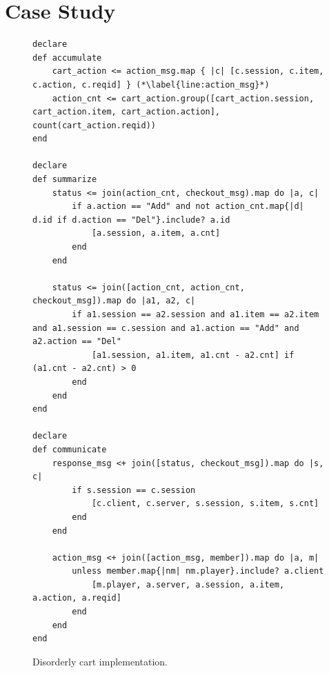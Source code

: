 \section{Case Study}
\label{sec:case}

\begin{figure}[t]
\begin{scriptsize}
\begin{lstlisting}
declare
def accumulate
	cart_action <= action_msg.map { |c| [c.session, c.item, c.action, c.reqid] } (*\label{line:action_msg}*)
	action_cnt <= cart_action.group([cart_action.session, cart_action.item, cart_action.action], count(cart_action.reqid))
end

declare
def summarize
	status <= join(action_cnt, checkout_msg).map do |a, c|
		if a.action == "Add" and not action_cnt.map{|d| d.id if d.action == "Del"}.include? a.id 
			[a.session, a.item, a.cnt] 
		end 
	end

	status <= join([action_cnt, action_cnt, checkout_msg]).map do |a1, a2, c| 
		if a1.session == a2.session and a1.item == a2.item and a1.session == c.session and a1.action == "Add" and a2.action == "Del"
			[a1.session, a1.item, a1.cnt - a2.cnt] if (a1.cnt - a2.cnt) > 0
		end
	end
end

declare 
def communicate
	response_msg <+ join([status, checkout_msg]).map do |s, c| 
		if s.session == c.session
			[c.client, c.server, s.session, s.item, s.cnt]
		end
	end

	action_msg <+ join([action_msg, member]).map do |a, m|
		unless member.map{|nm| nm.player}.include? a.client
			[m.player, a.server, a.session, a.item, a.action, a.reqid]
		end 
	end
end
\end{lstlisting}
\vspace{-10pt}
\caption{Disorderly cart implementation.}
\label{fig:pdg-disorderly}
\end{scriptsize}
\vspace{-2pt}
\end{figure}


